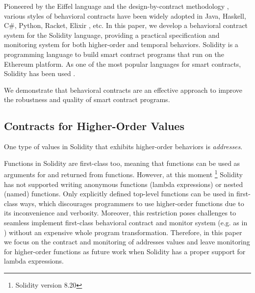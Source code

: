 Pioneered by the Eiffel language \cite{DBLP:books/ph/Meyer91} and the
design-by-contract methodology \cite{DBLP:conf/tools/Meyer98a}, various styles
of behavioral contracts have been widely adopted in Java, Haskell, C\#, Python,
Racket, Elixir \cite{DBLP:conf/erlang/0001BBHMEF22}, etc. 
In this paper, we develop a behavioral contract system \lang for the Solidity
language, providing a practical specification and monitoring system
for both higher-order and temporal behaviors.
Solidity is a programming language to build smart contract programs that run on
the Ethereum platform.  As one of the most popular languages for smart
contracts, Solidity has been used .

We demonstrate that behavioral contracts are an effective approach
to improve the robustness and quality of smart contract programs.




\subsection*{\textbf{Contracts for Higher-Order Values}}

One type of values in Solidity that exhibits higher-order behaviors is \emph{addresses}.

Functions in Solidity are first-class too, meaning that functions can be used as
arguments for and returned from functions. However, at this moment
\footnote{Solidity version 8.20} Solidity has not supported writing anonymous
functions (lambda expressions) or nested (named) functions.
Only explicitly defined top-level functions can be used in first-class ways,
which discourages programmers to use higher-order functions due to its
inconvenience and verbosity.
Moreover, this restriction poses challenges to seamless implement first-class
behavioral contract and monitor system (e.g. as in \cite{DBLP:conf/icfp/FindlerF02})
without an expensive whole program transformation.
Therefore, in this paper we focus on the contract and monitoring of addresses values
and leave monitoring for higher-order functions as future work when
Solidity has a proper support for lambda expressions.


